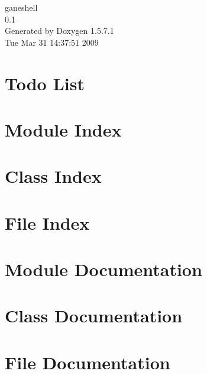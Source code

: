 \documentclass[a4paper]{book}
\begin{document}
\begin{titlepage}
\vspace*{7cm}
\begin{center}
{\Large ganeshell \\[1ex]\large 0.1 }\\
\vspace*{1cm}
{\large Generated by Doxygen 1.5.7.1}\\
\vspace*{0.5cm}
{\small Tue Mar 31 14:37:51 2009}\\
\end{center}
\end{titlepage}
\clearemptydoublepage
{}
\tableofcontents
\clearemptydoublepage
{}
\chapter{Todo List}
\label{todo}

\chapter{Module Index}

\chapter{Class Index}

\chapter{File Index}

\chapter{Module Documentation}


\chapter{Class Documentation}















\chapter{File Documentation}






















\printindex
\end{document}
